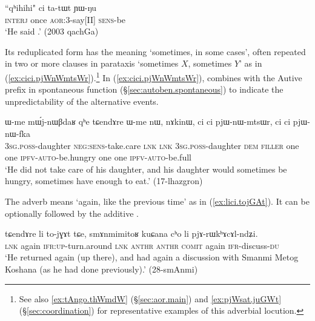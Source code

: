 \begin{exe}
\ex \label{ex:qhihihi.ci}
\gll ``qʰihihi" ci ta-tɯt ɲɯ-ŋu  \\
\textsc{interj} once \textsc{aor}:3\flobv{}-say[II] \textsc{sens}-be \\
\glt `He said .' (2003 qachGa)
\end{exe}

Its reduplicated form  has the meaning `sometimes, in some cases', often repeated in two or more clauses in parataxis `sometimes $X$, sometimes $Y$'  as in (\ref{ex:cici.pjWnWmtsWr}).\footnote{See also \ref{ex:tAngo.thWmdW} (§\ref{sec:aor.main}) and \ref{ex:pjWsat.juGWt} (§\ref{sec:coordination}) for representative examples of this adverbial locution. }  In  (\ref{ex:cici.pjWnWmtsWr}),  combines with the Autive prefix in spontaneous function (§\ref{sec:autoben.spontaneous}) to indicate the unpredictability of the alternative events.
 
\begin{exe}
\ex \label{ex:cici.pjWnWmtsWr}
\gll  ɯ-me mɯ́j-nɯβdaʁ qʰe tɕendɤre ɯ-me nɯ, nɤkinɯ, ci ci pjɯ-nɯ-mtsɯr, ci ci pjɯ-nɯ-fka  \\
 \textsc{3sg}.\textsc{poss}-daughter \textsc{neg}:\textsc{sens}-take.care \textsc{lnk} \textsc{lnk}  \textsc{3sg}.\textsc{poss}-daughter \textsc{dem} \textsc{filler} one one \textsc{ipfv}-\textsc{auto}-be.hungry one one \textsc{ipfv}-\textsc{auto}-be.full \\
 \glt  `He did not take care of his daughter, and his daughter would sometimes be hungry, sometimes have enough to eat.' (17-lhazgron)
 \end{exe}
 
 The adverb  means  `again, like the previous time' as in (\ref{ex:lici.tojGAt}). It can be optionally followed by the additive .
 
\begin{exe}
\ex \label{ex:lici.tojGAt}
\gll tɕendɤre li to-jɣɤt tɕe, smɤnmimitoʁ kuɕana cʰo li pjɤ-rɯkʰɤcɤl-ndʑi.  \\
\textsc{lnk} again \textsc{ifr}:\textsc{up}-turn.around \textsc{lnk}  \textsc{anthr} \textsc{anthr} \textsc{comit} again \textsc{ifr}-discuss-\textsc{du} \\
\glt `He returned again (up there), and had again a discussion with Smanmi Metog Koshana (as he had done previously).' (28-smAnmi)
 \end{exe}

